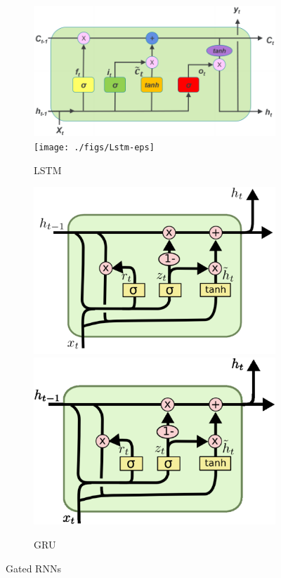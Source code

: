 \begin{figure}[ht] 
	\begin{subfigure}[b]{0.5\linewidth}
		\centering
		\ifpdf
		\includegraphics[width=0.95\linewidth]{./figs/Lstm-pdf}
		\else
		\texttt{[image: ./figs/Lstm-eps]}
		\fi
		\caption{LSTM} 
		\label{lstm} 
		\vspace{4ex}
	\end{subfigure}%
	\begin{subfigure}[b]{0.5\linewidth}
		\centering
		\ifpdf
		\includegraphics[width=0.95\linewidth]{./figs/Gru-pdf}
		\else
		\includegraphics[width=0.95\linewidth]{./figs/Gru-eps}
		\fi 
		\caption{GRU} 
		\label{gru} 
		\vspace{4ex}
	\end{subfigure}
	\caption{Gated RNNs}
	\label{conf}
\end{figure}

